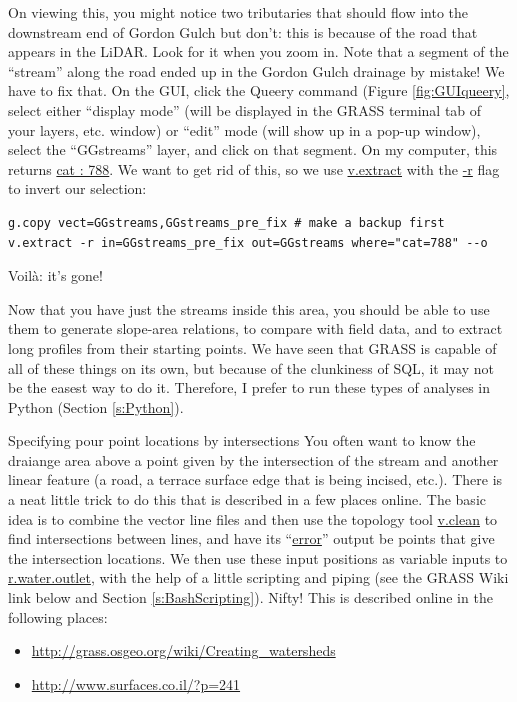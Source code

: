 \documentclass{book}
\begin{document}
On viewing this, you might notice two tributaries that should flow into the downstream end of Gordon Gulch but don't: this is because of the road that appears in the LiDAR. Look for it when you zoom in. Note that a segment of the ``stream'' along the road ended up in the Gordon Gulch drainage by mistake! We have to fix that. On the GUI, click the Queery command (Figure \ref{fig:GUIqueery}, select either ``display mode'' (will be displayed in the GRASS terminal tab of your layers, etc. window) or ``edit'' mode (will show up in a pop-up window), select the ``GGstreams'' layer, and click on that segment. On my computer, this returns \url{cat : 788}. We want to get rid of this, so we use \url{v.extract} with the \url{-r} flag to invert our selection:

\begin{lstlisting}
g.copy vect=GGstreams,GGstreams_pre_fix # make a backup first
v.extract -r in=GGstreams_pre_fix out=GGstreams where="cat=788" --o
\end{lstlisting}

Voil\`{a}: it's gone!

Now that you have just the streams inside this area, you should be able to use them to generate slope-area relations, to compare with field data, and to extract long profiles from their starting points. We have seen that GRASS is capable of all of these things on its own, but because of the clunkiness of SQL, it may not be the easest way to do it. Therefore, I prefer to run these types of analyses in Python (Section \ref{s:Python}).

\begin{boxx}[!ht]
\begin{bclogo}[arrondi = 0.1, logo = \bcrosevents]{Specifying pour point locations by intersections}
You often want to know the draiange area above a point given by the intersection of the stream and another linear feature (a road, a terrace surface edge that is being incised, etc.). There is a neat little trick to do this that is described in a few places online. The basic idea is to combine the vector line files and then use the topology tool \url{v.clean} to find intersections between lines, and have its ``\url{error}'' output be points that give the intersection locations. We then use these input positions as variable inputs to \url{r.water.outlet}, with the help of a little scripting and piping (see the GRASS Wiki link below and Section \ref{s:BashScripting}). Nifty! This is described online in the following places:
\begin{itemize}
 \item \url{http://grass.osgeo.org/wiki/Creating_watersheds}
 \item \url{http://www.surfaces.co.il/?p=241}
\end{itemize}
\end{bclogo}
\caption{Specifying pour point locations by intersections}
\end{boxx}
\end{document}
